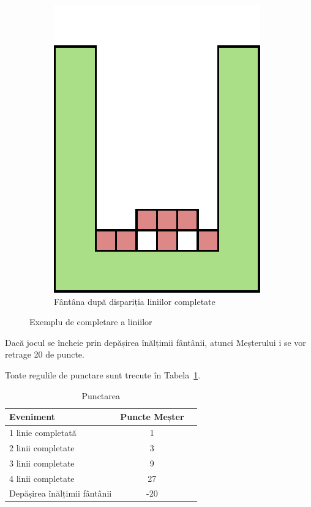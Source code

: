 \documentclass[12pt]{article}
\begin{document}
\begin{figure}[h!]
\begin{subfigure}[t]{0.23\textwidth}
    \includegraphics[width=\textwidth]{graphics/threelinesD.pdf}
    \caption{Fântâna după dispariția liniilor completate}
    \label{fig:threeLinesD}
  \end{subfigure}%
  \caption{Exemplu de completare a liniilor}%
  \label{fig:complete}%
\end{figure}

Dacă jocul se încheie prin depășirea înălțimii fântânii, atunci
Meșterului i se vor retrage 20 de puncte.

Toate regulile de punctare sunt trecute în Tabela~\ref{table:scoring}.

\begin{table}[h]
  \centering
  \begin{tabular}{| l | c | c |}
    \hline Eveniment & Puncte Meșter \\
    \hline 1 linie completată & 1  \\
    \hline 2 linii completate & 3  \\
    \hline 3 linii completate & 9  \\
    \hline 4 linii completate & 27 \\
    \hline Depășirea înălțimii fântânii & -20 \\
    \hline
  \end{tabular}
  \caption{Punctarea}
  \label{table:scoring}
\end{table}
\end{document}
